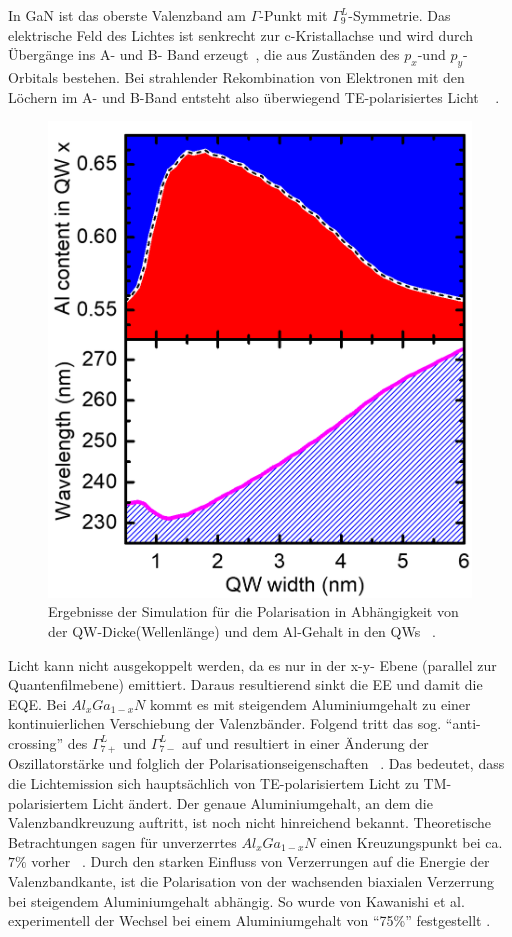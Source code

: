 \noindent
\newline
In GaN ist das oberste Valenzband am $\Gamma$-Punkt mit $\Gamma^{L}_{9}$-Symmetrie. Das elektrische Feld des Lichtes ist senkrecht zur c-Kristallachse und wird durch Übergänge ins A- und B- Band erzeugt~\cite{doi:10.1063/1.3574025}, die aus Zuständen des $p_x$-und $p_y$-Orbitals bestehen. Bei strahlender Rekombination von Elektronen mit den Löchern im A- und B-Band entsteht also überwiegend TE-polarisiertes Licht ~\cite{doi:10.1063/1.3574025} . 
%
\begin{figure}[ht!]
  \centering
  \begin{minipage}{\linewidth}
      \centering
      \includegraphics[width=0.6\linewidth]{Bilder/christophPolarisationSimu1.png}
      \caption{Ergebnisse der Simulation für die Polarisation in Abhängigkeit von der QW-Dicke(Wellenlänge) und dem Al-Gehalt in den QWs ~\cite{doi:10.1063/1.4932651}.}
      \label{fig:simu1chr}
  \end{minipage}
\end{figure}
%
Licht kann nicht ausgekoppelt werden, da es nur in der x-y- Ebene (parallel zur Quantenfilmebene) emittiert. Daraus resultierend sinkt die EE und damit die EQE. Bei $Al_{x}Ga_{1-x}N$ kommt es mit steigendem Aluminiumgehalt zu einer kontinuierlichen Verschiebung der Valenzbänder. Folgend tritt das sog. "`anti-crossing"' des $\Gamma^{L}_{7+}$ und $\Gamma^{L}_{7-}$ auf und resultiert in einer Änderung der Oszillatorstärke und folglich der Polarisationseigenschaften ~\cite{doi:10.1063/1.4932651}.
\newline
Das bedeutet, dass die Lichtemission sich hauptsächlich von TE-polarisiertem Licht zu TM-polarisiertem Licht ändert. Der genaue Aluminiumgehalt, an dem die Valenzbandkreuzung auftritt, ist noch nicht hinreichend bekannt. Theoretische Betrachtungen sagen für unverzerrtes $Al_{x}Ga_{1-x}N$ einen Kreuzungspunkt bei ca. $7\%$ vorher ~\cite{doi:10.1063/1.3675451}. Durch den starken Einfluss von Verzerrungen auf die Energie der  Valenzbandkante, ist die Polarisation von der wachsenden biaxialen Verzerrung bei steigendem Aluminiumgehalt abhängig. So wurde von Kawanishi et al. experimentell der Wechsel bei einem Aluminiumgehalt von "`75\%"' festgestellt \cite{doi:10.1063/1.2410242}. 
